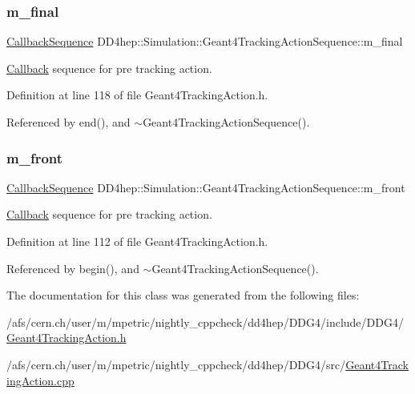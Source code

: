 \subsubsection{\texorpdfstring{m\+\_\+final}{m\_final}}
{\footnotesize\ttfamily \hyperlink{struct_d_d4hep_1_1_callback_sequence}{Callback\+Sequence} D\+D4hep\+::\+Simulation\+::\+Geant4\+Tracking\+Action\+Sequence\+::m\+\_\+final\hspace{0.3cm}{\ttfamily [protected]}}



\hyperlink{class_d_d4hep_1_1_callback}{Callback} sequence for pre tracking action. 



Definition at line 118 of file Geant4\+Tracking\+Action.\+h.



Referenced by end(), and $\sim$\+Geant4\+Tracking\+Action\+Sequence().

\hypertarget{class_d_d4hep_1_1_simulation_1_1_geant4_tracking_action_sequence_a7d0b671eddcd31052c3b86965529e962}{}\label{class_d_d4hep_1_1_simulation_1_1_geant4_tracking_action_sequence_a7d0b671eddcd31052c3b86965529e962} 
\subsubsection{\texorpdfstring{m\+\_\+front}{m\_front}}
{\footnotesize\ttfamily \hyperlink{struct_d_d4hep_1_1_callback_sequence}{Callback\+Sequence} D\+D4hep\+::\+Simulation\+::\+Geant4\+Tracking\+Action\+Sequence\+::m\+\_\+front\hspace{0.3cm}{\ttfamily [protected]}}



\hyperlink{class_d_d4hep_1_1_callback}{Callback} sequence for pre tracking action. 



Definition at line 112 of file Geant4\+Tracking\+Action.\+h.



Referenced by begin(), and $\sim$\+Geant4\+Tracking\+Action\+Sequence().



The documentation for this class was generated from the following files\+:\begin{DoxyCompactItemize}
\item 
/afs/cern.\+ch/user/m/mpetric/nightly\+\_\+cppcheck/dd4hep/\+D\+D\+G4/include/\+D\+D\+G4/\hyperlink{_geant4_tracking_action_8h}{Geant4\+Tracking\+Action.\+h}\item 
/afs/cern.\+ch/user/m/mpetric/nightly\+\_\+cppcheck/dd4hep/\+D\+D\+G4/src/\hyperlink{_geant4_tracking_action_8cpp}{Geant4\+Tracking\+Action.\+cpp}\end{DoxyCompactItemize}
